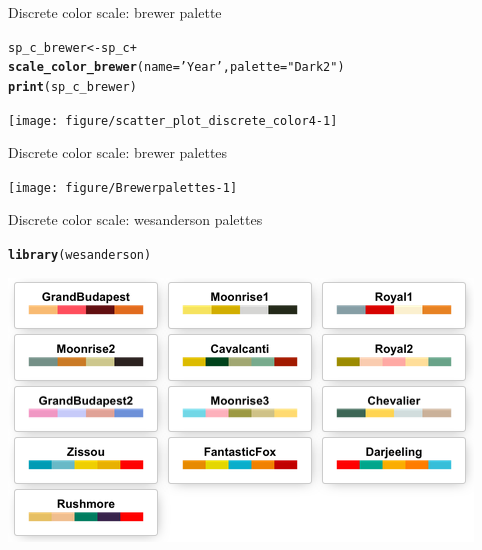 \documentclass{beamer}\usepackage[]{graphicx}\usepackage[]{color}
\makeatletter
\newcommand{\hlstr}[1]{\textcolor[rgb]{0.192,0.494,0.8}{#1}}%
\newcommand{\hlopt}[1]{\textcolor[rgb]{0,0,0}{#1}}%
\newcommand{\hlstd}[1]{\textcolor[rgb]{0.345,0.345,0.345}{#1}}%
\newcommand{\hlkwb}[1]{\textcolor[rgb]{0.69,0.353,0.396}{#1}}%
\newcommand{\hlkwc}[1]{\textcolor[rgb]{0.333,0.667,0.333}{#1}}%
\newcommand{\hlkwd}[1]{\textcolor[rgb]{0.737,0.353,0.396}{\textbf{#1}}}%
\newenvironment{kframe}{%
 \def\at@end@of@kframe{}%
 \ifinner\ifhmode%
  \def\at@end@of@kframe{\end{minipage}}%
  \begin{minipage}{\columnwidth}%
 \fi\fi%
 \def\FrameCommand##1{\hskip\@totalleftmargin \hskip-\fboxsep
 \colorbox{shadecolor}{##1}\hskip-\fboxsep
     \hskip-\linewidth \hskip-\@totalleftmargin \hskip\columnwidth}%
 \MakeFramed {\advance\hsize-\width
   \@totalleftmargin\z@ \linewidth\hsize
   \@setminipage}}%
 {\par\unskip\endMakeFramed%
 \at@end@of@kframe}
\newenvironment{knitrout}{}{} %
\makeatother
\begin{document}
\begin{frame}[fragile]{Discrete color scale: brewer palette}
\begin{knitrout}\footnotesize
{}\color{fgcolor}\begin{kframe}
\begin{alltt}
\hlstd{sp_c_brewer} \hlkwb{<-} \hlstd{sp_c} \hlopt{+}
  \hlkwd{scale_color_brewer}\hlstd{(}\hlkwc{name}\hlstd{=}\hlstr{'Year'}\hlstd{,} \hlkwc{palette}\hlstd{=}\hlstr{"Dark2"}\hlstd{)}
\hlkwd{print}\hlstd{(sp_c_brewer)}
\end{alltt}
\end{kframe}

{\centering \texttt{[image: figure/scatter\_plot\_discrete\_color4-1]} 

}



\end{knitrout}
\end{frame}

\begin{frame}[fragile]{Discrete color scale: brewer palettes}
\begin{knitrout}\footnotesize
{}\color{fgcolor}

{\centering \texttt{[image: figure/Brewerpalettes-1]} 

}



\end{knitrout}
\end{frame}

\begin{frame}[fragile]{Discrete color scale: wesanderson palettes}
\begin{knitrout}\footnotesize
{}\color{fgcolor}\begin{kframe}
\begin{alltt}
\hlkwd{library}\hlstd{(wesanderson)}
\end{alltt}
\end{kframe}
\end{knitrout}
\begin{center}
\includegraphics[scale=0.5]{wesanderson-color.png}
\end{center}

\end{frame}
\end{document}
